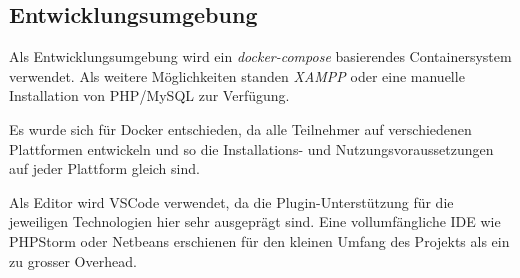 \subsection{Entwicklungsumgebung}

Als Entwicklungsumgebung wird ein \emph{docker-compose} basierendes Containersystem verwendet. Als weitere Möglichkeiten standen \emph{XAMPP} oder eine manuelle Installation von PHP/MySQL zur Verfügung.

Es wurde sich für Docker entschieden, da alle Teilnehmer auf verschiedenen Plattformen entwickeln und so die Installations- und Nutzungsvoraussetzungen auf jeder Plattform gleich sind.

Als Editor wird VSCode verwendet, da die Plugin-Unterstützung für die jeweiligen Technologien hier sehr ausgeprägt sind. Eine vollumfängliche IDE wie PHPStorm oder Netbeans erschienen für den kleinen Umfang des Projekts als ein zu grosser Overhead.
